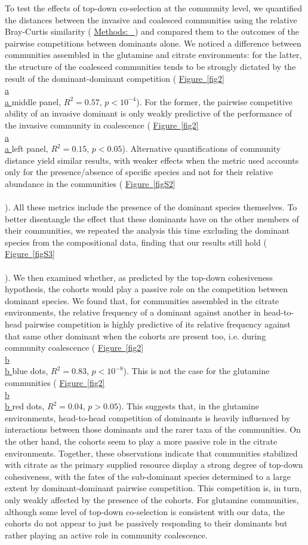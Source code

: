 \documentclass[a4paper,10pt]{article}
\newcommand{\figref}[2][]{%
  \hyperref[{#2}]{%
    Figure~\ref*{#2}%
    \ifx\\#1\\%
    \else
      #1%
    \fi
  }%
}
\newcommand{\methodsref}[1]{%
  \hyperref[{methods:#1}]{%
   Methods:~\nameref*{methods:#1}%
  }%
}
\begin{document}
To test the effects of top-down co-selection at the community level,
we quantified the distances between the invasive and coalesced communities
using the relative Bray-Curtis similarity (\methodsref{metrics})
and compared them to the outcomes of the pairwise competitions between dominants alone.
We noticed a difference between communities assembled in the glutamine and citrate environments:
for the latter,
the structure of the coalesced communities tends to be strongly dictated by the
result of the dominant-dominant competition
(\figref[a]{fig2} middle panel, $R^2=0.57$, $p<10^{-4}$).
For the former,
the pairwise competitive ability of an invasive dominant
is only weakly predictive of the performance of the invasive community in coalescence
(\figref[a]{fig2} left panel, $R^2=0.15$, $p<0.05$).
Alternative quantifications of community distance yield similar results,
with weaker effects when the metric used
accounts only for the presence/absence of specific species and not for their relative abundance in
the communities
(\figref{figS2}).
All these metrics include the presence of the dominant species themselves. To better disentangle the effect
that these dominants have on the other members of their communities, we repeated the analysis this time
excluding the dominant species from the compositional data, finding that our results still hold
(\figref{figS3}).
We then examined whether, as predicted by the top-down cohesiveness hypothesis,
the cohorts would play a passive role on the competition between dominant species.
We found that, for communities assembled in the citrate environments,
the relative frequency of a dominant against another in head-to-head pairwise competition
is highly predictive of its relative frequency against that same other dominant when the
cohorts are present too, i.e. during community coalescence
(\figref[b]{fig2} blue dots, $R^2=0.83$, $p<10^{-8}$).
This is not the case for the glutamine communities
(\figref[b]{fig2} red dots, $R^2=0.04$, $p>0.05$).
This suggests that, in the glutamine environments, head-to-head competition of dominants
is heavily influenced by interactions between those dominants and the rarer taxa of the communities.
On the other hand, the cohorts seem to play a more passive role in the citrate environments.
Together, these observations indicate that
communities stabilized with citrate as the primary supplied resource
display a strong degree of top-down cohesiveness,
with the fates of the sub-dominant species determined to a large extent by dominant-dominant
pairwise competition. This competition is, in turn, only weakly affected by the presence of the cohorts.
For glutamine communities, although some level of top-down co-selection is consistent with our data,
the cohorts do not appear to just be passively responding to their dominants
but rather playing an active role in community coalescence.
\end{document}
